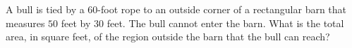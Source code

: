 A bull is tied by a $60$-foot rope to an outside corner of a rectangular barn that measures $50$ feet by $30$ feet. The bull cannot enter the barn. What is the total area, in square feet, of the region outside the barn that the bull can reach?
